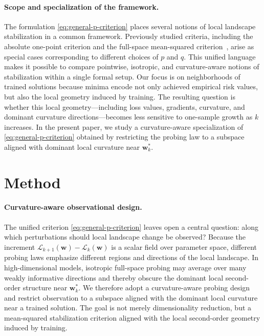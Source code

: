 \documentclass[10pt]{article}
\theoremstyle{plain}
\theoremstyle{remark}
\begin{document}
\paragraph{Scope and specialization of the framework.}
The formulation \eqref{eq:general-p-criterion} places several notions of local landscape stabilization in a common framework.
Previously studied criteria, including the absolute one-point criterion and the full-space mean-squared criterion~\citep{author:delta1,author:delta2}, arise as special cases corresponding to different choices of $p$ and $q$.
This unified language makes it possible to compare pointwise, isotropic, and curvature-aware notions of stabilization within a single formal setup.
Our focus is on neighborhoods of trained solutions because minima encode not only achieved empirical risk values, but also the local geometry induced by training.
The resulting question is whether this local geometry---including loss values, gradients, curvature, and dominant curvature directions---becomes less sensitive to one-sample growth as $k$ increases.
In the present paper, we study a curvature-aware specialization of \eqref{eq:general-p-criterion} obtained by restricting the probing law to a subspace aligned with dominant local curvature near $\mathbf w_k^*$.

\section{Method}
\label{sec:method}

\paragraph{Curvature-aware observational design.}
The unified criterion \eqref{eq:general-p-criterion} leaves open a central question: along which perturbations should local landscape change be observed?
Because the increment $\mathcal L_{k+1}(\mathbf w)-\mathcal L_k(\mathbf w)$ is a scalar field over parameter space, different probing laws emphasize different regions and directions of the local landscape.
In high-dimensional models, isotropic full-space probing may average over many weakly informative directions and thereby obscure the dominant local second-order structure near $\mathbf w_k^*$.
We therefore adopt a curvature-aware probing design and restrict observation to a subspace aligned with the dominant local curvature near a trained solution.
The goal is not merely dimensionality reduction, but a mean-squared stabilization criterion aligned with the local second-order geometry induced by training.
\end{document}
